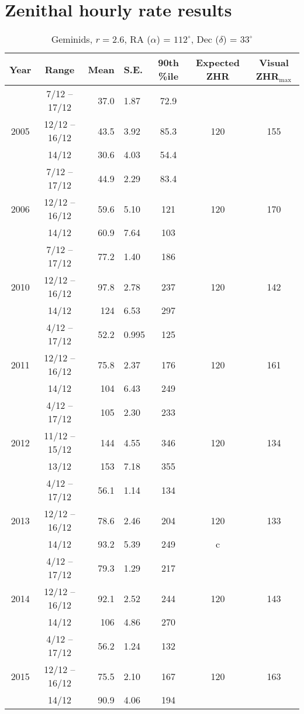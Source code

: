 \chapter{Zenithal hourly rate results}
\label{app:zhr}

\begin{table}[h!]
	\centering
	\begin{tabular}{|c|c|r@{ \,$\pm$\, }lc|cc|}
		\hline 
		Year & Range & Mean & S.E. & 90th \%ile & Expected ZHR & Visual ZHR$_{\text{max}}$ \\ 
		\hline 
		& 7/12 -- 17/12 & 37.0 & 1.87 & 72.9 & & \\ 
		2005 & 12/12 -- 16/12 & 43.5 & 3.92 & 85.3 & 120 & 155 \\ 
		& 14/12 & 30.6 & 4.03 & 54.4 & & \\ 
		\hline 
		& 7/12 -- 17/12 & 44.9 & 2.29 & 83.4 & & \\ 
		2006 & 12/12  -- 16/12 &	 59.6 & 5.10 & 121 & 120 & 170  \\ 
		& 14/12 & 60.9 & 7.64 & 103 & &  \\ 
		\hline 
		& 7/12 -- 17/12 & 77.2 & 1.40 & 186 & & \\
		2010 & 12/12 -- 16/12 & 97.8 & 2.78 & 237 & 120 & 142 \\ 
		& 14/12 & 124 & 6.53 & 297 & & \\ 
		\hline 
		& 4/12 -- 17/12 & 52.2 & 0.995 & 125 & & \\
		2011 & 12/12 -- 16/12 & 75.8 & 2.37 & 176 & 120 & 161\\ 
		& 14/12 & 104 & 6.43 & 249 & & \\ 
		\hline 
		& 4/12 -- 17/12 & 105 & 2.30 & 233 & & \\ 
		2012 & 11/12 -- 15/12 & 144 & 4.55 & 346 & 120 & 134 \\ 
		& 13/12 & 153 & 7.18 & 355 & & \\ 
		\hline 
		& 4/12 -- 17/12 & 56.1 & 1.14 & 134 & & \\ 
		2013 & 12/12 -- 16/12 & 78.6 & 2.46 & 204 & 120 & 133\\ 
		& 14/12 & 93.2 & 5.39 & 249 & c & \\ 
		\hline 
		& 4/12 -- 17/12 & 79.3 & 1.29 & 217 & & \\
		2014 & 12/12 -- 16/12 & 92.1 & 2.52 & 244 & 120 & 143 \\ 
		& 14/12 & 106 & 4.86 & 270 & & \\ 
		\hline 
		& 4/12 -- 17/12 & 56.2 & 1.24 & 132 & & \\
		2015 & 12/12 -- 16/12 & 75.5 & 2.10 & 167 & 120 & 163 \\ 
		& 14/12 & 90.9 & 4.06 & 194 & & \\ 
		\hline 
	\end{tabular} 
\caption{Geminids, $r = 2.6$, RA ($\alpha$) = $112^{\circ}$, Dec ($\delta$) = $33^{\circ}$}
\end{table}


